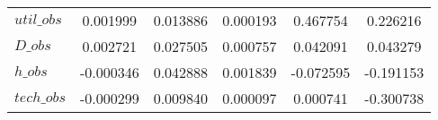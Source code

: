 \begin{center}
\begin{longtable}{lccccc}
$util\_obs      $	 & 	        0.001999	 & 	        0.013886	 & 	        0.000193	 & 	        0.467754	 & 	        0.226216 \\ 
$D\_obs         $	 & 	        0.002721	 & 	        0.027505	 & 	        0.000757	 & 	        0.042091	 & 	        0.043279 \\ 
$h\_obs         $	 & 	       -0.000346	 & 	        0.042888	 & 	        0.001839	 & 	       -0.072595	 & 	       -0.191153 \\ 
$tech\_obs      $	 & 	       -0.000299	 & 	        0.009840	 & 	        0.000097	 & 	        0.000741	 & 	       -0.300738 \\ 
\end{longtable}
 \end{center}
